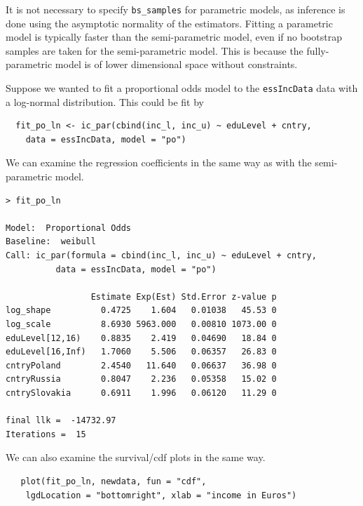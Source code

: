 \documentclass[11pt]{report}
\begin{document}
  It is not necessary to specify \texttt{bs\_samples} for parametric models, as 
  inference is done using the asymptotic normality of the estimators. Fitting a 
  parametric model is typically faster than the semi-parametric model, even if 
  no bootstrap samples are taken for the semi-parametric model. This is because the 
  fully-parametric model is of lower dimensional space without constraints. 
  
  Suppose we wanted to fit a proportional odds model to the \texttt{essIncData} data 
  with a log-normal distribution. This could be fit by
  
  \begin{verbatim}
  fit_po_ln <- ic_par(cbind(inc_l, inc_u) ~ eduLevel + cntry,
    data = essIncData, model = "po")
  \end{verbatim}
  
  We can examine the regression coefficients in the same way as with the semi-parametric model.
  
  \begin{verbatim}
> fit_po_ln

Model:  Proportional Odds 
Baseline:  weibull 
Call: ic_par(formula = cbind(inc_l, inc_u) ~ eduLevel + cntry, 
          data = essIncData, model = "po")

                 Estimate Exp(Est) Std.Error z-value p
log_shape          0.4725    1.604   0.01038   45.53 0
log_scale          8.6930 5963.000   0.00810 1073.00 0
eduLevel[12,16)    0.8835    2.419   0.04690   18.84 0
eduLevel[16,Inf)   1.7060    5.506   0.06357   26.83 0
cntryPoland        2.4540   11.640   0.06637   36.98 0
cntryRussia        0.8047    2.236   0.05358   15.02 0
cntrySlovakia      0.6911    1.996   0.06120   11.29 0

final llk =  -14732.97 
Iterations =  15 
  \end{verbatim}
  
  We can also examine the survival/cdf plots in the same way. 
  
  \begin{verbatim}
   plot(fit_po_ln, newdata, fun = "cdf", 
    lgdLocation = "bottomright", xlab = "income in Euros")
  \end{verbatim}
\end{document}
